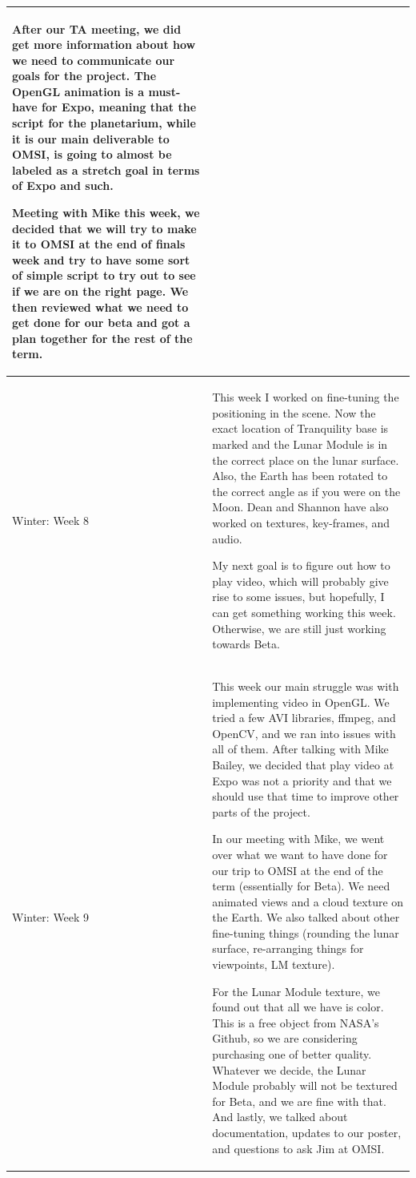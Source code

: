 \documentclass[onecolumn, draftclsnofoot,10pt, compsoc]{IEEEtran}
\begin{document}
\begin{longtable} {|p{1.5cm}|p{13.5cm}|}
After our TA meeting, we did get more information about how we need to communicate our goals for the project. The OpenGL animation is a must-have for Expo, meaning that the script for the planetarium, while it is our main deliverable to OMSI, is going to almost be labeled as a stretch goal in terms of Expo and such. 

Meeting with Mike this week, we decided that we will try to make it to OMSI at the end of finals week and try to have some sort of simple script to try out to see if we are on the right page. We then reviewed what we need to get done for our beta and got a plan together for the rest of the term. 
\\ \hline

Winter: Week 8 & 
This week I worked on fine-tuning the positioning in the scene. Now the exact location of Tranquility base is marked and the Lunar Module is in the correct place on the lunar surface. Also, the Earth has been rotated to the correct angle as if you were on the Moon. Dean and Shannon have also worked on textures, key-frames, and audio.

My next goal is to figure out how to play video, which will probably give rise to some issues, but hopefully, I can get something working this week. Otherwise, we are still just working towards Beta. 
\\ \hline

Winter: Week 9 & 
This week our main struggle was with implementing video in OpenGL. We tried a few AVI libraries, ffmpeg, and OpenCV, and we ran into issues with all of them. After talking with Mike Bailey, we decided that play video at Expo was not a priority and that we should use that time to improve other parts of the project. 

In our meeting with Mike, we went over what we want to have done for our trip to OMSI at the end of the term (essentially for Beta). We need animated views and a cloud texture on the Earth. We also talked about other fine-tuning things (rounding the lunar surface, re-arranging things for viewpoints, LM texture). 

For the Lunar Module texture, we found out that all we have is color. This is a free object from NASA's Github, so we are considering purchasing one of better quality. Whatever we decide, the Lunar Module probably will not be textured for Beta, and we are fine with that. And lastly, we talked about documentation, updates to our poster, and questions to ask Jim at OMSI. 
\\ \hline


\end{longtable}
\end{document}
